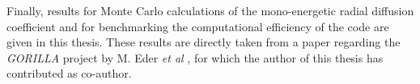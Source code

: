 \documentclass[main.tex]{subfiles}
\begin{document}
Finally, results for Monte Carlo calculations of the mono-energetic radial diffusion coefficient and for benchmarking the computational efficiency of the code are given in this thesis. These results are directly taken from a paper regarding the \textit{GORILLA} project by M. Eder \textit{et al} \cite{paper_gorilla}, for which the author of this thesis has contributed as co-author.
\end{document}

